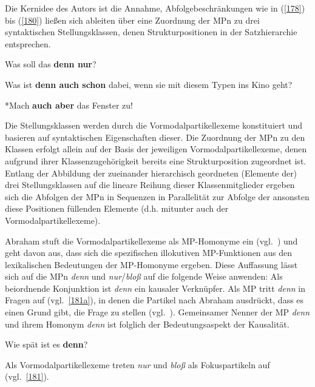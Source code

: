 Die Kernidee des Autors ist die Annahme, Abfolgebeschränkungen wie in (\ref{178}) bis (\ref{180}) ließen sich ableiten über eine Zuordnung der MPn zu drei syntaktischen Stellungsklassen, denen Strukturpositionen in der Satzhierarchie entsprechen. 

\begin{exe}
	\ex\label{178} 
	Was soll das \textbf{denn nur}?
\end{exe}
\begin{exe}
	\ex\label{179} 
	Was ist \textbf{denn auch schon} dabei, wenn sie mit diesem Typen ins Kino geht?
\end{exe}
\begin{exe}
	\ex\label{180} 
	*Mach \textbf{auch aber} das Fenster zu!
	\hfill\hbox{\citet[286--287]{Thurmair1989}}
\end{exe}
Die Stellungsklassen werden durch die Vormodalpartikellexeme  konstituiert und basieren auf syntaktischen Eigenschaften dieser. Die Zuordnung der MPn zu den Klassen erfolgt allein auf der Basis der jeweiligen Vormodalpartikellexeme, denen aufgrund ihrer Klassenzugehörigkeit bereits eine Strukturposition zugeordnet ist. Entlang der Abbildung der zueinander hierarchisch geordneten (Elemente der) drei Stellungsklassen auf die lineare Reihung dieser Klassenmitglieder ergeben sich die Abfolgen der MPn in Sequenzen in Parallelität zur Abfolge der ansonsten diese Positionen füllenden Elemente (d.h. mitunter auch der Vormodalpartikellexeme).

Abraham stuft die Vormodalpartikellexeme als MP-Homonyme  ein (vgl.\ \citeyear[95]{Abraham1995}) und geht davon aus, dass sich die spezifischen illokutiven MP-Funktionen aus den lexikalischen Bedeutungen der MP-Homonyme ergeben. Diese Auffassung lässt sich auf die MPn \textit{denn} und \textit{nur}/\textit{bloß} auf die folgende Weise anwenden: Als beiordnende Konjunktion ist \textit{denn} ein kausaler Verknüpfer. Als MP tritt \textit{denn} in Fragen auf (vgl.\ \ref{181a}), in denen die Partikel nach Abraham ausdrückt, dass es einen Grund gibt, die Frage zu stellen (vgl.\ \citeyear[101]{Abraham1995}). Gemeinsamer Nenner der MP \textit{denn} und ihrem Homonym \textit{denn} ist folglich der Bedeutungsaspekt der Kausalität.

\begin{exe}
	\ex\label{181a} 
	Wie spät ist es \textbf{denn}?
	\hfill\hbox{\citet[99]{Abraham1995}}
\end{exe}
Als Vormodalpartikellexeme treten \textit{nur} und \textit{bloß} als Fokuspartikeln  auf (vgl.\ \ref{181}).

